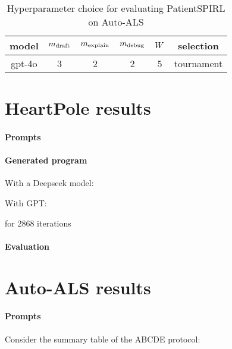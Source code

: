 \begin{table}
    \centering
    \begin{tabular}{|c|c|c|c|c|c|}
        model & $m_\text{draft}$ & $m_\text{explain}$ & $m_\text{debug}$ & $W$ & selection \\
        \midrule
        gpt-4o & 3 & 2 & 2 & 5 & tournament
    \end{tabular}
    \caption{Hyperparameter choice for evaluating PatientSPIRL on Auto-ALS}
    \label{tab:patientspirl-auto-als}
\end{table}

\newpage
\section{HeartPole results}

\paragraph{Prompts}

\paragraph{Generated program}

With a Deepseek model:



With GPT:



for 2868 iterations

\paragraph{Evaluation}



\newpage
\section{Auto-ALS results}

\paragraph{Prompts}

Consider the summary table of the ABCDE protocol:

